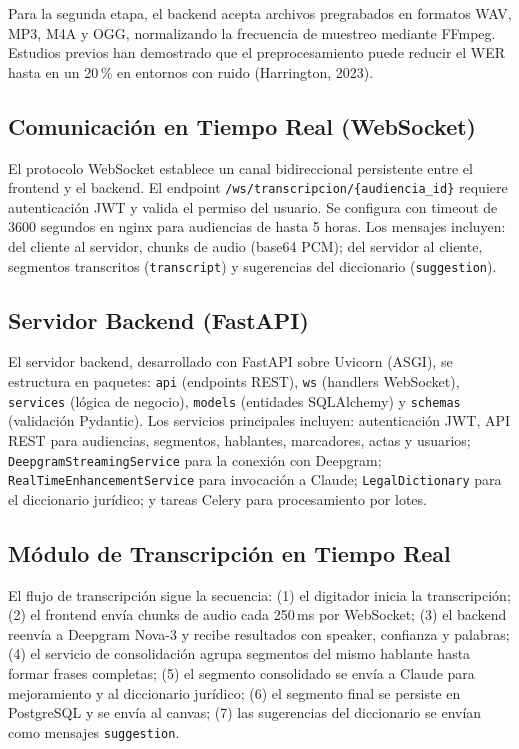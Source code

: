 \documentclass[12pt,a4paper,oneside]{report}
\begin{document}
Para la segunda etapa, el backend acepta archivos pregrabados en formatos WAV, MP3, M4A y OGG, normalizando la frecuencia de muestreo mediante FFmpeg. Estudios previos han demostrado que el preprocesamiento puede reducir el WER hasta en un 20\,\% en entornos con ruido (Harrington, 2023).

\subsection{Comunicación en Tiempo Real (WebSocket)}

El protocolo WebSocket establece un canal bidireccional persistente entre el frontend y el backend. El endpoint \texttt{/ws/transcripcion/\{audiencia\_id\}} requiere autenticación JWT y valida el permiso del usuario. Se configura con timeout de 3600 segundos en nginx para audiencias de hasta 5 horas. Los mensajes incluyen: del cliente al servidor, chunks de audio (base64 PCM); del servidor al cliente, segmentos transcritos (\texttt{transcript}) y sugerencias del diccionario (\texttt{suggestion}).

\subsection{Servidor Backend (FastAPI)}

El servidor backend, desarrollado con FastAPI sobre Uvicorn (ASGI), se estructura en paquetes: \texttt{api} (endpoints REST), \texttt{ws} (handlers WebSocket), \texttt{services} (lógica de negocio), \texttt{models} (entidades SQLAlchemy) y \texttt{schemas} (validación Pydantic). Los servicios principales incluyen: autenticación JWT, API REST para audiencias, segmentos, hablantes, marcadores, actas y usuarios; \texttt{DeepgramStreamingService} para la conexión con Deepgram; \texttt{RealTimeEnhancementService} para invocación a Claude; \texttt{LegalDictionary} para el diccionario jurídico; y tareas Celery para procesamiento por lotes.

\subsection{Módulo de Transcripción en Tiempo Real}

El flujo de transcripción sigue la secuencia: (1) el digitador inicia la transcripción; (2) el frontend envía chunks de audio cada 250\,ms por WebSocket; (3) el backend reenvía a Deepgram Nova-3 y recibe resultados con speaker, confianza y palabras; (4) el servicio de consolidación agrupa segmentos del mismo hablante hasta formar frases completas; (5) el segmento consolidado se envía a Claude para mejoramiento y al diccionario jurídico; (6) el segmento final se persiste en PostgreSQL y se envía al canvas; (7) las sugerencias del diccionario se envían como mensajes \texttt{suggestion}.
\end{document}
